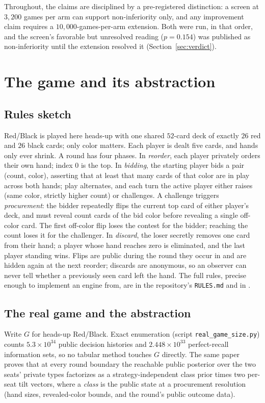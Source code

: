 \documentclass[11pt]{article}
\theoremstyle{plain}
\theoremstyle{definition}
\theoremstyle{remark}
\newcommand{\code}[1]{\texttt{\small #1}}
\newcommand{\game}{\ensuremath{G}}
\begin{document}
Throughout, the claims are disciplined by a pre-registered distinction:
a screen at $3{,}200$ games per arm can support non-inferiority only,
and any improvement claim requires a $10{,}000$-games-per-arm
extension. Both were run, in that order, and the screen's favorable but
unresolved reading ($p=0.154$) was published as non-inferiority until
the extension resolved it (Section~\ref{sec:verdict}).

\section{The game and its abstraction}\label{sec:game}

\subsection{Rules sketch}

Red/Black is played here heads-up with one shared $52$-card deck of
exactly $26$ red and $26$ black cards; only color matters. Each player
is dealt five cards, and hands only ever shrink. A round has four
phases. In \emph{reorder}, each player privately orders their own hand;
index $0$ is the top. In \emph{bidding}, the starting player bids a pair
(count, color), asserting that at least that many cards of that color
are in play across both hands; play alternates, and each turn the active
player either raises (same color, strictly higher count) or challenges.
A challenge triggers \emph{procurement}: the bidder repeatedly flips the
current top card of either player's deck, and must reveal count cards of
the bid color before revealing a single off-color card. The first
off-color flip loses the contest for the bidder; reaching the count
loses it for the challenger. In \emph{discard}, the loser secretly
removes one card from their hand; a player whose hand reaches zero is
eliminated, and the last player standing wins. Flips are public during
the round they occur in and are hidden again at the next reorder;
discards are anonymous, so an observer can never tell whether a
previously seen card left the hand. The full rules, precise enough to
implement an engine from, are in the repository's \code{RULES.md} and in
\cite{rb1}.

\subsection{The real game and the abstraction}

Write $\game$ for heads-up Red/Black. Exact enumeration \cite{rb1}
(script \code{real\_game\_size.py}) counts $5.3\times10^{34}$ public
decision histories and $2.448\times10^{33}$ perfect-recall information
sets, so no tabular method touches $\game$ directly. The same paper
proves that at every round boundary the reachable public posterior over
the two seats' private types factorizes as a strategy-independent class
prior times two per-seat tilt vectors, where a \emph{class} is the
public state at a procurement resolution (hand sizes, revealed-color
bounds, and the round's public outcome data).
\end{document}
